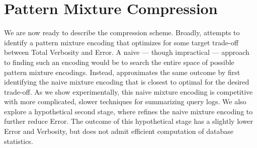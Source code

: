 \section{Pattern Mixture Compression}
\label{sec:constructingencodings}
We are now ready to describe the \systemnameone compression scheme.
Broadly, \systemnameone attempts to identify a pattern mixture encoding that optimizes for some target trade-off between Total Verbosity and Error.  
A naive --- though impractical --- approach to finding such an encoding would be to search the entire space of possible pattern mixture encodings.
Instead, \systemnameone approximates the same outcome by first identifying the naive mixture encoding that is closest to optimal for the desired trade-off.
As we show experimentally, this naive mixture encoding is competitive with more complicated, slower techniques for summarizing query logs.
We also explore a hypothetical second stage, where \systemnameone refines the naive mixture encoding to further reduce Error.
The outcome of this hypothetical stage has a slightly lower Error and Verbosity, but does not admit efficient computation of database statistics. 

